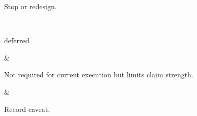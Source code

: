 {\begin{longtable}
\begin{minipage}[t]{\linewidth}
Stop or redesign.
\end{minipage} \\
\hline
\begin{minipage}[t]{\linewidth}\RaggedRight\hspace{0pt}
deferred
\end{minipage} & \begin{minipage}[t]{\linewidth}\RaggedRight\hspace{0pt}
Not required for current execution but limits claim strength.
\end{minipage} & \begin{minipage}[t]{\linewidth}\RaggedRight\hspace{0pt}
Record caveat.
\end{minipage} \\
\end{longtable}
}


